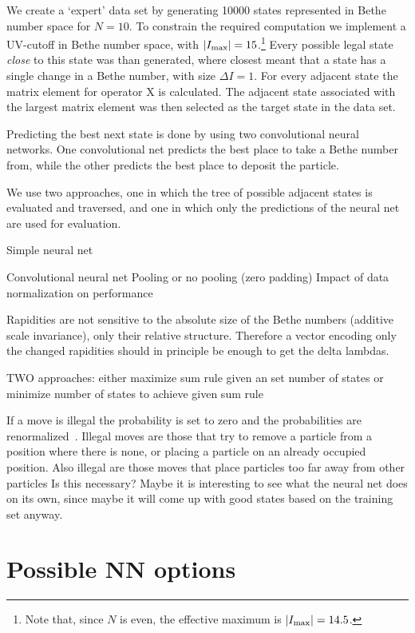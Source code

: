\documentclass[11pt, a4paper]{report} %
\begin{document}
We create a `expert' data set by generating 10000 states represented in Bethe number space for $N=10$.
To constrain the required computation we implement a UV-cutoff in Bethe number space, with $\abs{I_{\max}}=15$.\footnote{Note that, since $N$ is even, the effective maximum is $\abs{I_{\max}}=14.5$.}
Every possible legal state \textit{close} to this state was than generated, where closest meant that a state has a single change in a Bethe number, with size $\Delta I = 1$.
For every adjacent state the matrix element for operator X is calculated.
The adjacent state associated with the largest matrix element was then selected as the target state in the data set.

Predicting the best next state is done by using two convolutional neural networks.
One convolutional net predicts the best place to take a Bethe number from, while the other predicts the best place to deposit the particle.


We use two approaches, one in which the tree of possible adjacent states is evaluated and traversed, and one in which only the predictions of the neural net are used for evaluation.

Simple neural net


Convolutional neural net
Pooling or no pooling (zero padding) 
Impact of data normalization on performance


Rapidities are not sensitive to the absolute size of the Bethe numbers (additive scale invariance), only their relative structure.
Therefore a vector encoding only the changed rapidities should in principle be enough to get the delta lambdas.


TWO approaches: either maximize sum rule given an set number of states or minimize number of states to achieve given sum rule


If a move is illegal the probability is set to zero and the probabilities are renormalized~\cite{pmlr-v37-clark15}.
Illegal moves are those that try to remove a particle from a position where there is none, or placing a particle on an already occupied position.
Also illegal are those moves that place particles too far away from other particles Is this necessary? Maybe it is interesting to see what the neural net does on its own, since maybe it will come up with good states based on the training set anyway.



\section{Possible NN options}
\end{document}
